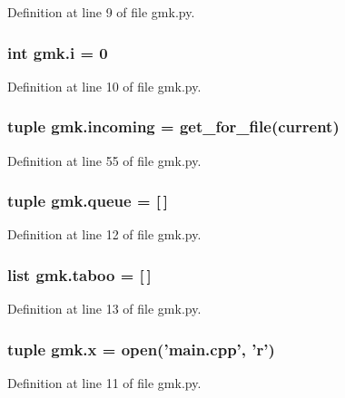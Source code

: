 Definition at line 9 of file gmk.\-py.

\hypertarget{namespacegmk_a9184966e48659fd84c1d7c1407d263df}{
\subsubsection[{i}]{\setlength{\rightskip}{0pt plus 5cm}int gmk.\-i = 0}}\label{namespacegmk_a9184966e48659fd84c1d7c1407d263df}


Definition at line 10 of file gmk.\-py.

\hypertarget{namespacegmk_a49fcde59011710713b0cacfb83b655b1}{
\subsubsection[{incoming}]{\setlength{\rightskip}{0pt plus 5cm}tuple gmk.\-incoming = {\bf get\-\_\-for\-\_\-file}({\bf current})}}\label{namespacegmk_a49fcde59011710713b0cacfb83b655b1}


Definition at line 55 of file gmk.\-py.

\hypertarget{namespacegmk_a58e2fe1e23b8e790d8d497d460d2bf7b}{
\subsubsection[{queue}]{\setlength{\rightskip}{0pt plus 5cm}tuple gmk.\-queue = \mbox{[}$\,$\mbox{]}}}\label{namespacegmk_a58e2fe1e23b8e790d8d497d460d2bf7b}


Definition at line 12 of file gmk.\-py.

\hypertarget{namespacegmk_a86d641bddd418bd61985965f537878dc}{
\subsubsection[{taboo}]{\setlength{\rightskip}{0pt plus 5cm}list gmk.\-taboo = \mbox{[}$\,$\mbox{]}}}\label{namespacegmk_a86d641bddd418bd61985965f537878dc}


Definition at line 13 of file gmk.\-py.

\hypertarget{namespacegmk_a1fd0b3028c3238f93be9ee0080027025}{
\subsubsection[{x}]{\setlength{\rightskip}{0pt plus 5cm}tuple gmk.\-x = open('main.\-cpp', 'r')}}\label{namespacegmk_a1fd0b3028c3238f93be9ee0080027025}


Definition at line 11 of file gmk.\-py.

